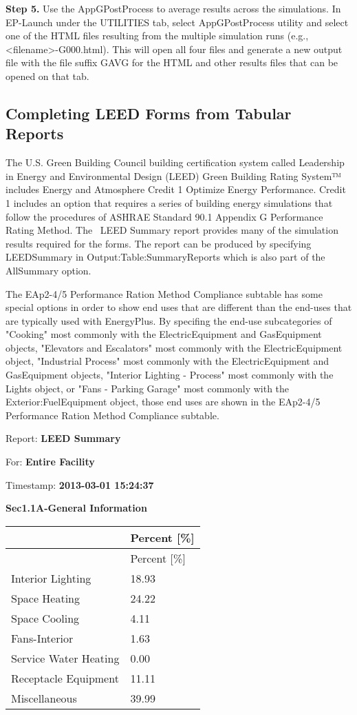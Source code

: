 \textbf{Step 5.} Use the AppGPostProcess to average results across the simulations. In EP-Launch under the UTILITIES tab, select AppGPostProcess utility and select one of the HTML files resulting from the multiple simulation runs (e.g., \textless{}filename\textgreater{}-G000.html). This will open all four files and generate a new output file with the file suffix GAVG for the HTML and other results files that can be opened on that tab.

\subsection{Completing LEED Forms from Tabular Reports}\label{completing-leed-forms-from-tabular-reports}

The U.S. Green Building Council building certification system called Leadership in Energy and Environmental Design (LEED) Green Building Rating System™ includes Energy and Atmosphere Credit 1 Optimize Energy Performance. Credit 1 includes an option that requires a series of building energy simulations that follow the procedures of ASHRAE Standard 90.1 Appendix G Performance Rating Method. The~ LEED Summary report provides many of the simulation results required for the forms. The report can be produced by specifying LEEDSummary in Output:Table:SummaryReports which is also part of the AllSummary option. 

The EAp2-4/5 Performance Ration Method Compliance subtable has some special options in order to show end uses that are different than the end-uses that are typically used with EnergyPlus. By specifing the end-use subcategories of "Cooking" most commonly with the ElectricEquipment and GasEquipment objects, "Elevators and Escalators" most commonly with the ElectricEquipment object, "Industrial Process" most commonly with the ElectricEquipment and GasEquipment objects, "Interior Lighting - Process" most commonly with the Lights object, or "Fans - Parking Garage" most commonly with the Exterior:FuelEquipment object, those end uses are shown in the EAp2-4/5 Performance Ration Method Compliance subtable.


Report: \textbf{LEED Summary}

For: \textbf{Entire Facility}

Timestamp: \textbf{2013-03-01 15:24:37}

\textbf{Sec1.1A-General Information}

\begin{longtable}[c]{@{}ll@{}}
\toprule 
 & Percent [\%] \tabularnewline
\midrule
\endfirsthead

\toprule 
 & Percent [\%] \tabularnewline
\midrule
\endhead

Interior Lighting & 18.93 \tabularnewline
Space Heating & 24.22 \tabularnewline
Space Cooling & 4.11 \tabularnewline
Fans-Interior & 1.63 \tabularnewline
Service Water Heating & 0.00 \tabularnewline
Receptacle Equipment & 11.11 \tabularnewline
Miscellaneous & 39.99 \tabularnewline
\bottomrule
\end{longtable}

